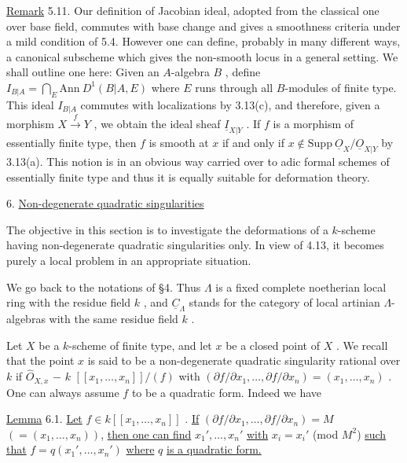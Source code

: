 \underline{Remark} 5.11.  Our definition of Jacobian ideal, adopted from the classical one over base field, commutes with base change and gives a smoothness criteria under a mild condition of 5.4. However one can define, probably in many different ways, a canonical subscheme which gives the non-smooth locus in a general setting. We shall outline one here:  Given an $A$-algebra  $B$  , define  $I_{B|A} = \bigcap_E \mathrm{Ann}\ D^1(B|A,E)$ where  $E$  runs through all  $B$-modules of finite type. This ideal  $I_{B|A}$  commutes with localizations by 3.13(c), and therefore, given a morphism  $X \xrightarrow{\ f\ } Y$  , we obtain the ideal sheaf  $\underline{I}_{X|Y}$  . If  $f$  is a morphism of essentially finite type, then  $f$  is smooth at  $x$  if and only if  $x \notin \mathrm{Supp}\ \underline{O}_X/\underline{O}_{X|Y}$  by 3.13(a). This notion is in an obvious way carried over to adic formal schemes of essentially
finite type and thus it is equally suitable for deformation theory.


6.  \underline{Non-degenerate quadratic singularities}

The objective in this section is to investigate the deformations of a $k$-scheme having non-degenerate quadratic singularities only. In view of 4.13, it becomes purely a local problem in an appropriate situation.

We go back to the notations of  §4. Thus  $\Lambda$  is a fixed complete noetherian local ring with the residue field  $k$  , and  $\underline{C}_\Lambda$  stands for the category of local artinian $\Lambda$-algebras with the same residue field  $k$  .

Let  $X$  be a $k$-scheme of finite type, and let  $x$  be a closed point of $X$  . We recall that the point  $x$  is said to be a non-degenerate quadratic singularity rational over  $k$  if  $\hat{O}_{X,x}$ $-$ $k$ $[[x_1,\ldots,x_n]]/(f)$  with $(\partial f/\partial x_1,\ldots,\partial f/\partial x_n) = (x_1,\ldots,x_n)$  . One  can always assume  $f$  to be a quadratic form. Indeed we have

\underline{Lemma} 6.1.  \underline{Let}  $f \in k[[x_1,\ldots,x_n]]$  . \underline{If}  $(\partial f/\partial x_1,\ldots,\partial f/\partial x_n) = M$  $(= (x_1,\ldots,x_n))$, \underline{then one can find}  $x_1',\ldots,x_n'$  \underline{with}  $x_i = x_i'$  (mod $M^2$)  \underline{such that} $f = q(x_1',\ldots,x_n')$  \underline{where}  $q$  \underline{is a quadratic form.}

